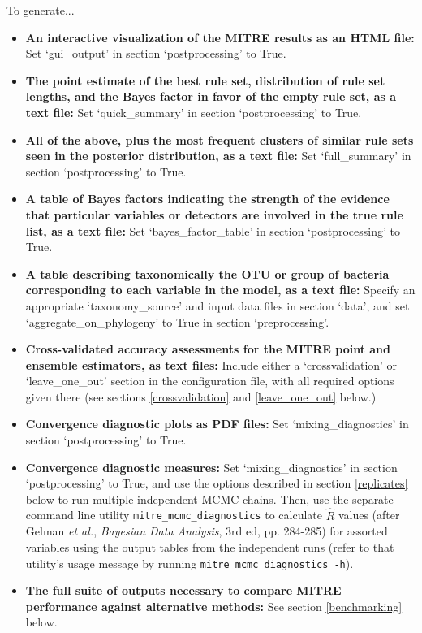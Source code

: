 \documentclass[12pt]{report}
\begin{document}
To generate...
\begin{itemize}
\item \textbf{An interactive visualization of the MITRE results as an
  HTML file:} Set `gui\_output' in section `postprocessing' to True.
\item \textbf{The point estimate of the best rule set, distribution of
  rule set lengths, and the Bayes factor in favor of the empty rule
  set, as a text file:} Set `quick\_summary' in section
  `postprocessing' to True.
\item \textbf{All of the above, plus the most frequent clusters of
  similar rule sets seen in the posterior distribution, as a text
  file:} Set `full\_summary' in section `postprocessing' to True.
\item \textbf{A table of Bayes factors indicating the strength of the
  evidence that particular variables or detectors are involved in the
  true rule list, as a text file:} Set `bayes\_factor\_table' in
  section `postprocessing' to True.
\item \textbf{A table describing taxonomically the OTU or group of
  bacteria corresponding to each variable in the model, as a text
  file:} Specify an appropriate `taxonomy\_source' and input data
  files in section `data', and set `aggregate\_on\_phylogeny' to True
  in section `preprocessing'.
\item \textbf{Cross-validated accuracy assessments for the MITRE point
  and ensemble estimators, as text files:} Include either a `crossvalidation' or
  `leave\_one\_out' section in the configuration file, with all
  required options given there (see sections \ref{crossvalidation} and
  \ref{leave_one_out} below.)
\item \textbf{Convergence diagnostic plots as PDF files:} Set
  `mixing\_diagnostics' in section `postprocessing' to True.
\item \textbf{Convergence diagnostic measures:} Set
  `mixing\_diagnostics' in section `postprocessing' to True, and use
  the options described in section \ref{replicates} below to run
  multiple independent MCMC chains. Then, use the separate command
  line utility \texttt{mitre\_mcmc\_diagnostics} to calculate $\hat R$
  values (after Gelman \textit{et al.}, \textit{Bayesian Data
    Analysis}, 3rd ed, pp. 284-285) for assorted variables using the
  output tables from the independent runs (refer to that utility's
  usage message by running \texttt{mitre\_mcmc\_diagnostics -h}).
\item \textbf{The full suite of outputs necessary to compare MITRE
  performance against alternative methods:} See section
  \ref{benchmarking} below.
\end{itemize}  
\end{document}
